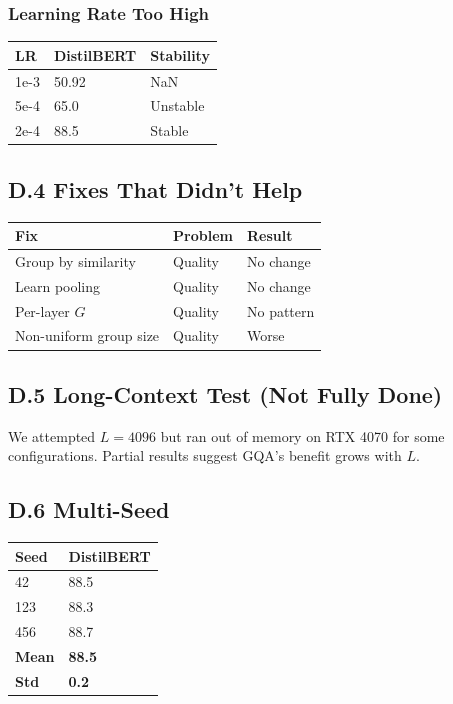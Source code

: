 \subsubsection{Learning Rate Too High}

\begin{table}[H]
\centering
\small
\begin{tabular}{lll}
\toprule
\textbf{LR} & \textbf{DistilBERT} & \textbf{Stability} \\
\midrule
1e-3 & 50.92 & NaN \\
5e-4 & 65.0 & Unstable \\
2e-4 & 88.5 & Stable \\
\bottomrule
\end{tabular}
\end{table}

\subsection{D.4 Fixes That Didn't Help}

\begin{table}[H]
\centering
\small
\begin{tabular}{lll}
\toprule
\textbf{Fix} & \textbf{Problem} & \textbf{Result} \\
\midrule
Group by similarity & Quality & No change \\
Learn pooling & Quality & No change \\
Per-layer $G$ & Quality & No pattern \\
Non-uniform group size & Quality & Worse \\
\bottomrule
\end{tabular}
\end{table}

\subsection{D.5 Long-Context Test (Not Fully Done)}

We attempted $L = 4096$ but ran out of memory on RTX 4070 for some 
configurations. Partial results suggest GQA's benefit grows with $L$.

\subsection{D.6 Multi-Seed}

\begin{table}[H]
\centering
\small
\begin{tabular}{ll}
\toprule
\textbf{Seed} & \textbf{DistilBERT} \\
\midrule
42 & 88.5 \\
123 & 88.3 \\
456 & 88.7 \\
\textbf{Mean} & \textbf{88.5} \\
\textbf{Std} & \textbf{0.2} \\
\bottomrule
\end{tabular}
\end{table}

